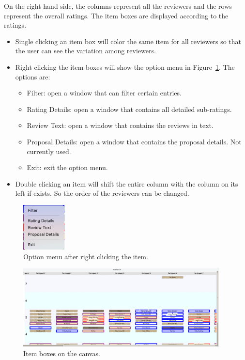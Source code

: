 \documentclass[a4paper,11pt]{memoir}
\begin{document}
On the right-hand side, the columns represent all the reviewers and the rows represent the 
overall ratings. The item boxes are displayed according to the ratings.

\begin{itemize}
\item Single clicking an item box will color the same item for all reviewers so that the user can see the variation among reviewers.

\item Right clicking the item boxes will show the option menu in Figure~\ref{fig:items_menu}.
The options are:
  \begin{itemize}
      \item Filter: open a window that can filter certain entries.
      \item Rating Details: open a window that contains all detailed sub-ratings.
      \item Review Text: open a window that contains the reviews in text.
      \item Proposal Details: open a window that contains the proposal details. {\color{red} Not currently used.}
      \item Exit: exit the option menu.
  \end{itemize}

\item Double clicking an item will shift the entire column with the column on its left if exists.
So the order of the reviewers can be changed.
\end{itemize}

  \begin{figure}
    \begin{center}
      \includegraphics[width=0.2\textwidth]{art/item_menu.png}
      \caption{Option menu after right clicking the item.}\label{fig:items_menu}
    \end{center}
  \end{figure}

  \begin{figure}
    \begin{center}
      \includegraphics[width=0.95\textwidth]{art/items.png}
      \caption{Item boxes on the canvas.}\label{fig:items}
    \end{center}
  \end{figure}
\end{document}
